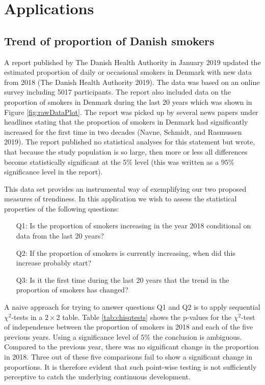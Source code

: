 \documentclass[
  11pt,
]{article}
\theoremstyle{nonumberplain}
\begin{document}
\hypertarget{sec:application}{%
\section{Applications}\label{sec:application}}

\hypertarget{trend-of-proportion-of-danish-smokers}{%
\subsection*{Trend of proportion of Danish
smokers}\label{trend-of-proportion-of-danish-smokers}}

A report published by The Danish Health Authority in January 2019
updated the estimated proportion of daily or occasional smokers in
Denmark with new data from 2018 (The Danish Health Authority 2019). The
data was based on an online survey including 5017 participants. The
report also included data on the proportion of smokers in Denmark during
the last 20 years which was shown in Figure \ref{fig:rawDataPlot}. The
report was picked up by several news papers under headlines stating that
the proportion of smokers in Denmark had significantly increased for the
first time in two decades (Navne, Schmidt, and Rasmussen 2019). The
report published no statistical analyses for this statement but wrote,
that because the study population is so large, then more or less all
differences become statistically significant at the \(5\%\) level (this
was written as a \(95\%\) significance level in the report).

This data set provides an instrumental way of exemplifying our two
proposed measures of trendiness. In this application we wish to assess
the statistical properties of the following questions:

\begin{itemize}
\item[Q1:]{Is the proportion of smokers increasing in the year 2018 conditional on data from the last 20 years?}
\item[Q2:]{If the proportion of smokers is currently increasing, when did this increase probably start?}
\item[Q3:]{Is it the first time during the last 20 years that the trend in the proportion of smokers has changed?}
\end{itemize}

A naive approach for trying to answer questions Q1 and Q2 is to apply
sequential \(\chi^2\)-tests in a \(2\times 2\) table. Table
\ref{tab:chisqtests} shows the p-values for the \(\chi^2\)-test of
independence between the proportion of smokers in 2018 and each of the
five previous years. Using a significance level of \(5\%\) the
conclusion is ambiguous. Compared to the previous year, there was no
significant change in the proportion in 2018. Three out of these five
comparisons fail to show a significant change in proportions. It is
therefore evident that such point-wise testing is not sufficiently
perceptive to catch the underlying continuous development.
\end{document}
